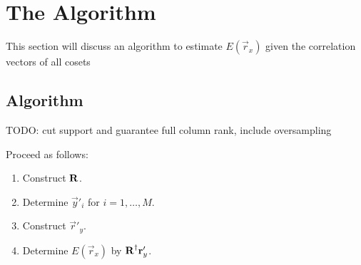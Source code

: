 \documentclass[a4paper, openany, oneside]{memoir}
\begin{document}
\section{The Algorithm}
This section will discuss an algorithm to estimate $E(\vec{r}_x)$ given the correlation vectors of all cosets
\subsection{Algorithm}
TODO: cut support and guarantee full column rank, include oversampling

Proceed as follows:
\begin{enumerate}
    \item Construct $\boldsymbol{\mathbf{R}}$.
    \item Determine $\vec{y}'_i$ for $i = 1,\ldots,M$.
    \item Construct $\vec{r}'_y$.
    \item Determine $E(\vec{r}_x)$ by $\boldsymbol{\mathbf{R}}^\dagger\boldsymbol{\mathbf{r}}'_y$.
\end{enumerate}
\end{document}
